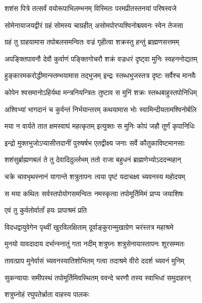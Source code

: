 \twolineshloka
{शशंस पित्रे तत्सर्वं वयोरूपाभिलम्भनम्}
{विस्मितः परमप्रीतस्तनयां परिषस्वजे}%

\twolineshloka
{सोमेनायाजयद्वीरं ग्रहं सोमस्य चाग्रहीत्}
{असोमपोरप्यश्विनोश्च्यवनः स्वेन तेजसा}%

\twolineshloka
{ग्रहं तु ग्राहयामास तपोबलसमन्वितः}
{वज्रं गृहीत्वा शक्रस्तु हन्तुं ब्राह्मणसत्तमम्}%

\twolineshloka
{अपङ्क्तिपावनौ देवौ कुर्वाणं पङ्क्तिगोचरौ}
{शक्रं वज्रधरं दृष्ट्वा मुनिः स्वहननोद्यतम्}%

\twolineshloka
{हुङ्कारमकरोद्धीमान्स्तम्भयामास तद्भुजम्}
{इन्द्रः स्तब्धभुजस्तत्र दृष्टः सर्वैश्च मानवैः}%

\twolineshloka
{कोपेन श्वसमानोऽहिर्यथा मन्त्रनियन्त्रितः}
{तुष्टाव स मुनिं शक्रः स्तब्धबाहुस्तपोनिधिम्}%

\twolineshloka
{अश्विभ्यां भागदानं च कुर्वन्तं निर्भयान्तरम्}
{कथयामास भोः स्वामिन्दीयतामश्विनोर्बलि}%

\twolineshloka
{मया न वार्यते तात क्षमस्वाघं महत्कृतम्}
{इत्युक्तः स मुनिः कोपं जहौ तूर्णं कृपानिधिः}%

\twolineshloka
{इन्द्रो मुक्तभुजोऽप्यासीत्तदानीं पुरुषर्षभ}
{एतद्वीक्ष्य जनाः सर्वे कौतुकाविष्टमानसाः}%

\twolineshloka
{शशंसुर्ब्राह्मणबलं ते तु देवादिदुर्ल्लभम्}
{ततो राजा बहुधनं ब्राह्मणेभ्योऽददन्महान्}%

\twolineshloka
{चक्रे चावभृथस्नानं यागान्ते शत्रुतापनः}
{त्वया पृष्टं यदाचक्ष्व च्यवनस्य महोदयम्}%

\twolineshloka
{स मया कथितः सर्वस्तपोयोगसमन्वितः}
{नमस्कृत्वा तपोमूर्तिमिमं प्राप्य जयाशिषः}%



\onelineshloka
{एवं तु कुर्वतोर्वार्तां हयः प्रापाश्रमं प्रति}%

\twolineshloka
{विदधद्वायुवेगेन पृथ्वीं खुरविलक्षिताम्}
{दूर्वाङ्कुरान्मुखाग्रेण चरंस्तत्र महाश्रमे}%

\twolineshloka
{मुनयो यावदादाय दर्भान्स्नातुं गता नदीम्}
{शत्रुघ्नः शत्रुसेनायास्तापनः शूरसम्मतः}%

\twolineshloka
{तावत्प्राप मुनेर्वासं च्यवनस्यातिशोभितम्}
{गत्वा तदाश्रमे वीरो ददर्श च्यवनं मुनिम्}%

\twolineshloka
{सुकन्यायाः समीपस्थं तपोमूर्तिमिवस्थितम्}
{ववन्दे चरणौ तस्य स्वाभिधां समुदाहरन्}%

\onelineshloka
{शत्रुघ्नोहं रघुपतेर्भ्राता वाहस्य पालकः}%

